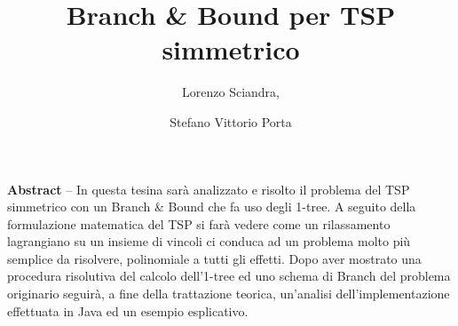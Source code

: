 \documentclass[
	article,			%
	12pt,				%
	oneside,			%
	a4paper,			%
	english,			%
	italian,				%
	sumario=tradicional,
	]{abntex2}
\title{Branch \& Bound per TSP simmetrico}
\author{Lorenzo Sciandra,\and Stefano Vittorio Porta}
\begin{document}
\textual

\pagestyle{meuestilo}

\frenchspacing 

\maketitle
\thispagestyle{meuestilo}

\begin{changemargin}{1cm}{1cm} 
 \textbf{Abstract} – In questa tesina sarà analizzato e risolto il problema del TSP simmetrico con un Branch \& Bound che fa uso degli 1-tree. A seguito della formulazione matematica del TSP si farà vedere come un rilassamento lagrangiano su un insieme di vincoli ci conduca ad un problema molto più semplice da risolvere, polinomiale a tutti gli effetti. Dopo aver mostrato una procedura risolutiva del calcolo dell'1-tree ed uno schema di Branch del problema originario seguirà, a fine della trattazione teorica, un'analisi dell'implementazione effettuata in Java ed un esempio esplicativo.

 \vspace{\onelineskip}
 
 \noindent
\end{changemargin}


\end{document}
